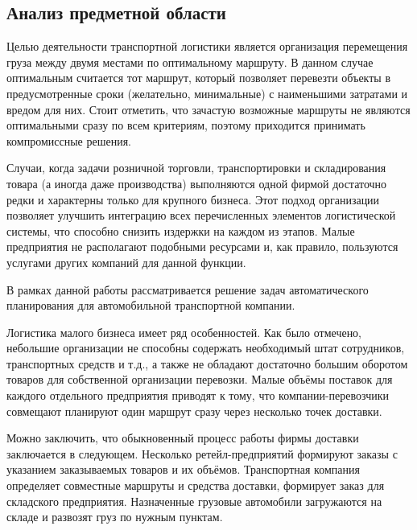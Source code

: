 \subsection{Анализ предметной области}
	Целью деятельности транспортной логистики является организация перемещения груза между двумя местами по оптимальному маршруту\cite{subj:main}. В данном случае оптимальным считается тот маршрут, который позволяет перевезти объекты в предусмотренные сроки (желательно, минимальные) с наименьшими затратами и вредом для них. Стоит отметить, что зачастую возможные маршруты не являются оптимальными сразу по всем критериям, поэтому приходится принимать компромиссные решения.
	
	Случаи, когда задачи розничной торговли, транспортировки и складирования товара (а иногда даже производства) выполняются одной фирмой достаточно редки и характерны только для крупного бизнеса. Этот подход организации позволяет улучшить интеграцию всех перечисленных элементов логистической системы, что способно снизить издержки на каждом из этапов. Малые предприятия не располагают подобными ресурсами и, как правило, пользуются услугами других компаний для данной функции.  
	
	В рамках данной работы рассматривается решение задач автоматического планирования для автомобильной транспортной компании.
	
	Логистика малого бизнеса имеет ряд особенностей\cite{subj:small_business}. Как было отмечено, небольшие организации не способны содержать необходимый штат сотрудников, транспортных средств и т.д., а также не обладают достаточно большим оборотом товаров для собственной организации перевозки. Малые объёмы поставок для каждого отдельного предприятия приводят к тому, что компании-перевозчики совмещают планируют один маршрут сразу через несколько точек доставки.
	
	Можно заключить, что обыкновенный процесс работы фирмы доставки заключается в следующем. Несколько ретейл-предприятий формируют заказы с указанием заказываемых товаров и их объёмов. Транспортная компания определяет совместные маршруты и средства доставки, формирует заказ для складского предприятия. Назначенные грузовые автомобили загружаются на складе и развозят груз по нужным пунктам.

